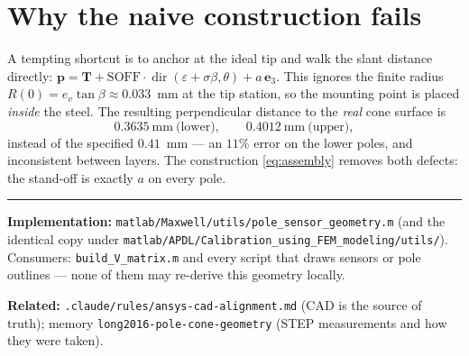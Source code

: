 \documentclass[12pt]{article}
\newcommand{\ehat}[1]{\mathbf{e}_{#1}}
\newcommand{\dir}{\operatorname{dir}}
\begin{document}
\section{Why the naive construction fails}
\label{sec:old}

A tempting shortcut is to anchor at the ideal tip and walk the slant distance directly:
$\mathbf{p}=\mathbf{T}+\mathrm{SOFF}\cdot\dir(\varepsilon+\sigma\beta,\theta)+a\,\ehat{3}$.
This ignores the finite radius $R(0)=e_v\tan\beta\approx0.033$~mm at the tip station,
so the mounting point is placed \emph{inside} the steel. The resulting perpendicular
distance to the \emph{real} cone surface is
\[
0.3635\ \mathrm{mm}\ \text{(lower)},\qquad 0.4012\ \mathrm{mm}\ \text{(upper)},
\]
instead of the specified $0.41$~mm --- an $11\%$ error on the lower poles, and
inconsistent between layers. The construction \eqref{eq:assembly} removes both defects:
the stand-off is exactly $a$ on every pole.

\vspace{6pt}
\hrule
\vspace{4pt}
{\footnotesize
\textbf{Implementation:} \texttt{matlab/Maxwell/utils/pole\_sensor\_geometry.m}
(and the identical copy under \texttt{matlab/APDL/Calibration\_using\_FEM\_modeling/utils/}).
Consumers: \texttt{build\_V\_matrix.m} and every script that draws sensors or pole
outlines --- none of them may re-derive this geometry locally.\par
\textbf{Related:} \texttt{.claude/rules/ansys-cad-alignment.md} (CAD is the source of
truth); memory \texttt{long2016-pole-cone-geometry} (STEP measurements and how they
were taken).}
\end{document}

